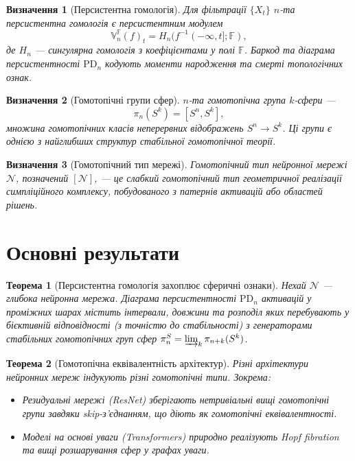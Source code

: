 \documentclass{article}
\newtheorem{definition}{Визначення}
\newtheorem{theorem}{Теорема}
\begin{document}
\begin{definition}[Персистентна гомологія]
Для фільтрації $\{X_t\}$ $n$-та персистентна гомологія є персистентним модулем
\[
\mathbb{V}_n^{\mathbb{F}}(f)_t = H_n(f^{-1}(-\infty, t]; \mathbb{F}),
\]
де $H_n$ — сингулярна гомологія з коефіцієнтами у полі $\mathbb{F}$. Баркод та діаграма персистентності $\text{PD}_n$ кодують моменти народження та смерті топологічних ознак.
\end{definition}

\begin{definition}[Гомотопічні групи сфер]
$n$-та гомотопічна група $k$-сфери —
\[
\pi_n(S^k) = [S^n, S^k],
\]
множина гомотопічних класів неперервних відображень $S^n \to S^k$. Ці групи є однією з найглибших структур стабільної гомотопічної теорії.
\end{definition}

\begin{definition}[Гомотопічний тип мережі]
Гомотопічний тип нейронної мережі $\mathcal{N}$, позначений $[\mathcal{N}]$, — це слабкий гомотопічний тип геометричної реалізації симпліційного комплексу, побудованого з патернів активацій або областей рішень.
\end{definition}

\section{Основні результати}

\begin{theorem}[Персистентна гомологія захоплює сферичні ознаки]
Нехай $\mathcal{N}$ — глибока нейронна мережа. Діаграма персистентності $\text{PD}_n$ активацій у проміжних шарах містить інтервали, довжини та розподіл яких перебувають у бієктивній відповідності (з точністю до стабільності) з генераторами стабільних гомотопічних груп сфер $\pi_n^S = \varinjlim_k \pi_{n+k}(S^k)$.
\end{theorem}

\begin{theorem}[Гомотопічна еквівалентність архітектур]
Різні архітектури нейронних мереж індукують різні гомотопічні типи. Зокрема:
\begin{itemize}
    \item Резидуальні мережі (ResNet) зберігають нетривіальні вищі гомотопічні групи завдяки skip-з’єднанням, що діють як гомотопічні еквівалентності.
    \item Моделі на основі уваги (Transformers) природно реалізують Hopf fibration та вищі розшарування сфер у графах уваги.
\end{itemize}
\end{theorem}
\end{document}
